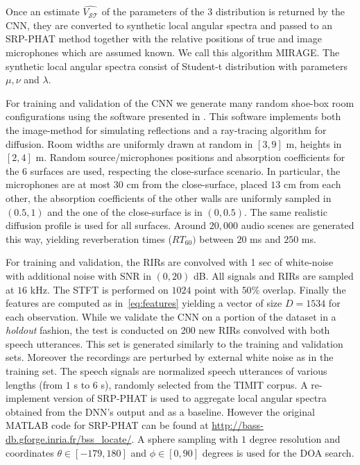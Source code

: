 Once an estimate $\hat{V_\mathcal{ST}}$ of the parameters of the 3 distribution is returned by the CNN, they are converted to synthetic local angular spectra and passed to an SRP-PHAT method together with the relative positions of true and image microphones which are assumed known. We call this algorithm MIRAGE. The synthetic local angular spectra consist of Student-t distribution with parameters $\mu, \nu$ and $\lambda$.

For training and validation of the CNN we generate many random shoe-box room configurations using the software presented in \cite{schimmel2009fast}. This software implements both the image-method for simulating reflections and a ray-tracing algorithm for diffusion. Room widths are uniformly drawn at random in $[3, 9]$ m, heights in $[2, 4]$ m. Random source/microphones positions and absorption coefficients for the 6 surfaces are used, respecting the close-surface scenario. In particular, the microphones are at most $30$ cm from the close-surface, placed $13$ cm from each other, the absorption coefficients of the other walls are uniformly sampled in $(0.5, 1)$ and the one of the close-surface is in $(0, 0.5)$. The same realistic diffusion profile \cite{gaultier2017vast} is used for all surfaces. Around $20,000$ audio scenes are generated this way, yielding reverberation times ($RT_{60})$ between $20$ ms and $250$ ms.

For training and validation, the RIRs are convolved with 1 sec of white-noise with additional noise with SNR in $(0,20)$ dB.
All signals and RIRs are sampled at $16$ kHz. The STFT is performed on $1024$ point with $50\%$ overlap. Finally the features are computed as in~\eqref{eq:features} yielding a vector of size $D = 1534$ for each observation.
While we validate the CNN on a portion of the dataset in a \textit{holdout} fashion, the test is conducted on 200 new RIRs convolved with both speech utterances. This set is generated similarly to the training and validation sets. Moreover the recordings are perturbed by external white noise as in the training set. The speech signals are normalized speech utterances of various lengths (from $1$ s to $6$ s), randomly selected from the TIMIT corpus.
A re-implement version of SRP-PHAT is used to aggregate local angular spectra obtained from the DNN's output and as a baseline. However the original MATLAB code for SRP-PHAT can be found at \url{http://bass-db.gforge.inria.fr/bss_locate/}. A sphere sampling with $1$ degree resolution and coordinates $\theta \in [-179, 180]$ and $\phi \in [0, 90]$ degrees is used for the DOA search.



